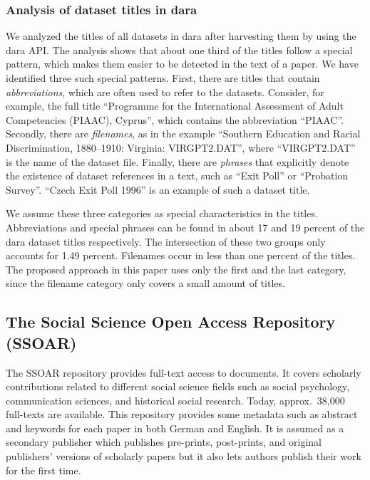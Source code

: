 \documentclass{IOS-Book-Article}
\newcommand{\dara}{\textsf{da\textbar ra}}
\begin{document}
  \subsubsection{Analysis of dataset titles in {\dara}}
  We analyzed the titles of all datasets in {\dara} after harvesting them by using the {\dara} API.
  The analysis shows that about one third of the titles follow a special pattern, which makes them easier to be detected in the text of a paper.
  We have identified three such special patterns.
  First, there are titles that contain \emph{abbreviations}, which are often used to refer to the datasets. 
  Consider, for example, the full title \enquote{Programme for the International Assessment of Adult Competencies (PIAAC), Cyprus}, which contains the abbreviation \enquote{PIAAC}.
  Secondly, there are \emph{filenames}, as in the example \enquote{Southern Education and Racial Discrimination, 1880--1910: Virginia: VIRGPT2.DAT}, where \enquote{VIRGPT2.DAT} is the name of the dataset file.
  Finally, there are \emph{phrases} that explicitly denote the existence of 
  dataset references in a text, such as \enquote{Exit Poll} or \enquote{Probation Survey}.
  \enquote{Czech Exit Poll 1996} is an example of such a dataset title. 

  We assume these three categories as special characteristics in the titles.
  Abbreviations and special phrases can be found in about 17 and 19 percent of the {\dara} dataset titles respectively.
  The intersection of these two groups only accounts for 1.49 percent.
  Filenames occur in less than one percent of the titles. 
The proposed approach in this paper uses only the first and the last category, since the filename category only covers a small amount of titles.

\subsection{The Social Science Open Access Repository (SSOAR)}
The SSOAR repository provides full-text access to documents.
It covers scholarly contributions related to different social science fields such as social psychology, communication sciences, and historical social research.
Today, approx.\ 38,000 full-texts are available.
This repository provides some metadata such as abstract and keywords for each paper in both German and English.
It is assumed as a secondary publisher which publishes pre-prints, post-prints, and original publishers' versions of scholarly papers but it also lets authors publish their work for the first time.
\end{document}
